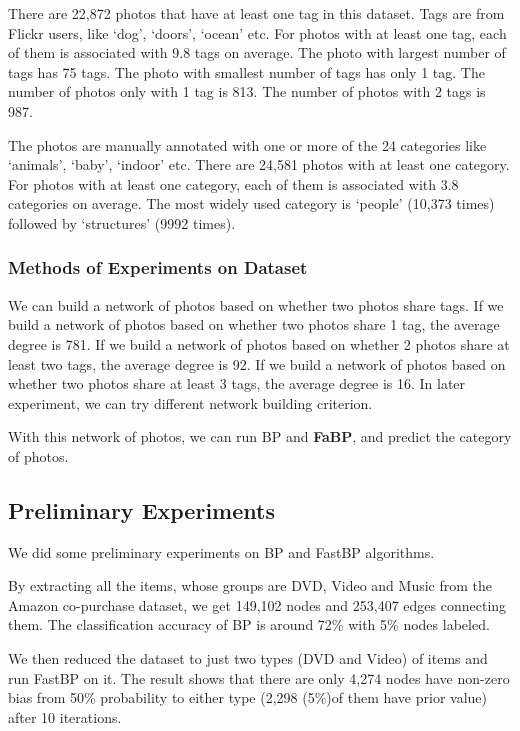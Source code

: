 There are 22,872 photos that have at least one tag in this dataset. Tags are from Flickr users, like ‘dog’, ‘doors’, ‘ocean’ etc. For photos with at least one tag, each of them is associated with 9.8 tags on average. The photo with largest number of tags has 75 tags. The photo with smallest number of tags has only 1 tag. The number of photos only with 1 tag is 813. The number of photos with 2 tags is 987.

The photos are manually annotated with one or more of the 24 categories like ‘animals’, ‘baby’, ‘indoor’ etc. There are 24,581 photos with at least one category. For photos with at least one category, each of them is associated with 3.8 categories on average.  The most widely used category is ‘people’ (10,373 times) followed by ‘structures’ (9992 times). 

\subsubsection*{Methods of Experiments on Dataset}
We can build a network of photos based on whether two photos share tags. If we build a network of photos based on whether two photos share 1 tag, the average degree is 781. If we build a network of photos based on whether 2 photos share at least two tags, the average degree is 92. If we build a network of photos based on whether two photos share at least 3 tags, the average degree is 16. In later experiment, we can try different network building criterion.

With this network of photos, we can run BP and \textbf{FaBP}, and predict the category of photos.


 \subsection{Preliminary Experiments}
We did some preliminary experiments on BP and FastBP algorithms.

By extracting all the items, whose groups are DVD, Video and Music from the Amazon co-purchase dataset, we get 149,102 nodes and 253,407 edges connecting them.
The classification accuracy of BP is around 72\% with 5\% nodes labeled.

We then reduced the dataset to just two types (DVD and Video) of items and run FastBP on it.
The result shows that there are only 4,274 nodes have non-zero bias from 50\% probability to either type (2,298 (5\%)of them have prior value) after 10 iterations.
